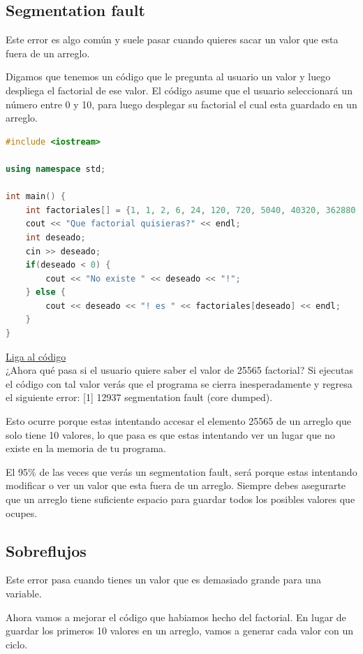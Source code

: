 \documentclass{article}
\begin{document}
\subsection{Segmentation fault}
Este error es algo común y suele pasar cuando quieres sacar un valor que esta fuera de un arreglo.

Digamos que tenemos un código que le pregunta al usuario un valor y luego despliega el factorial de ese valor. El código asume que el usuario seleccionará un número entre 0 y 10, para luego desplegar su factorial el cual esta guardado en un arreglo.

\begin{lstlisting}[language=C++, caption=Error de inicialización]
#include <iostream>

using namespace std;

int main() {
    int factoriales[] = {1, 1, 2, 6, 24, 120, 720, 5040, 40320, 362880, 3628800};
    cout << "Que factorial quisieras?" << endl;
    int deseado;
    cin >> deseado;
    if(deseado < 0) {
        cout << "No existe " << deseado << "!";
    } else {
        cout << deseado << "! es " << factoriales[deseado] << endl;
    }
}
\end{lstlisting}
\href{https://repl.it/@Jamesscn/Indices-Inexistentes}{Liga al código}\\

¿Ahora qué pasa si el usuario quiere saber el valor de 25565 factorial? Si ejecutas el código con tal valor verás que el programa se cierra inesperadamente y regresa el siguiente error: [1] 12937 segmentation fault (core dumped).

Esto ocurre porque estas intentando accesar el elemento 25565 de un arreglo que solo tiene 10 valores, lo que pasa es que estas intentando ver un lugar que no existe en la memoria de tu programa.

El 95\% de las veces que verás un segmentation fault, será porque estas intentando modificar o ver un valor que esta fuera de un arreglo. Siempre debes asegurarte que un arreglo tiene suficiente espacio para guardar todos los posibles valores que ocupes.

\subsection{Sobreflujos}
Este error pasa cuando tienes un valor que es demasiado grande para una variable.

Ahora vamos a mejorar el código que habiamos hecho del factorial. En lugar de guardar los primeros 10 valores en un arreglo, vamos a generar cada valor con un ciclo.
\end{document}
